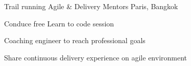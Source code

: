

\begin{cventries}

  \cventry
    {Trail running} %
    {Agile \& Delivery Mentors} %
    {Paris, Bangkok} %
    {
      \begin{cvitems} %
        \item {Conduce free Learn to code session}
        \item {Coaching engineer to reach professional goals}
        \item {Share continuous delivery experience on  agile environment}
      \end{cvitems}
    }
    { } %


\end{cventries}
